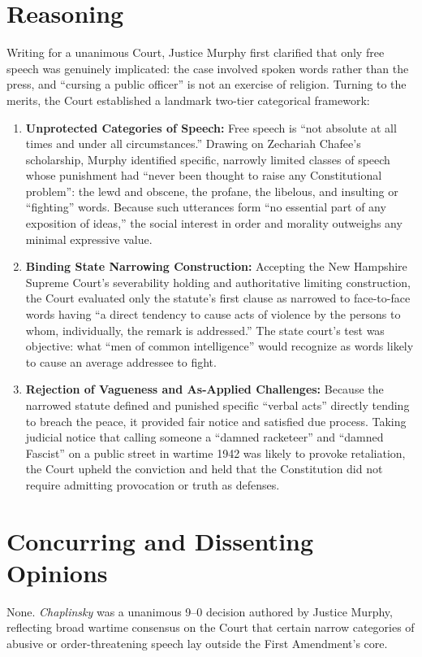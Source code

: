 \documentclass[12pt]{article}
\begin{document}
\section{Reasoning}
Writing for a unanimous Court, Justice Murphy first clarified that only free speech was genuinely implicated: the case involved spoken words rather than the press, and ``cursing a public officer'' is not an exercise of religion. Turning to the merits, the Court established a landmark two-tier categorical framework:
\begin{enumerate}
  \item \textbf{Unprotected Categories of Speech:} Free speech is ``not absolute at all times and under all circumstances.'' Drawing on Zechariah Chafee's scholarship, Murphy identified specific, narrowly limited classes of speech whose punishment had ``never been thought to raise any Constitutional problem'': the lewd and obscene, the profane, the libelous, and insulting or ``fighting'' words. Because such utterances form ``no essential part of any exposition of ideas,'' the social interest in order and morality outweighs any minimal expressive value.
  \item \textbf{Binding State Narrowing Construction:} Accepting the New Hampshire Supreme Court's severability holding and authoritative limiting construction, the Court evaluated only the statute's first clause as narrowed to face-to-face words having ``a direct tendency to cause acts of violence by the persons to whom, individually, the remark is addressed.'' The state court's test was objective: what ``men of common intelligence'' would recognize as words likely to cause an average addressee to fight.
  \item \textbf{Rejection of Vagueness and As-Applied Challenges:} Because the narrowed statute defined and punished specific ``verbal acts'' directly tending to breach the peace, it provided fair notice and satisfied due process. Taking judicial notice that calling someone a ``damned racketeer'' and ``damned Fascist'' on a public street in wartime 1942 was likely to provoke retaliation, the Court upheld the conviction and held that the Constitution did not require admitting provocation or truth as defenses.
\end{enumerate}

\section{Concurring and Dissenting Opinions}
None. \textit{Chaplinsky} was a unanimous 9--0 decision authored by Justice Murphy, reflecting broad wartime consensus on the Court that certain narrow categories of abusive or order-threatening speech lay outside the First Amendment's core.
\end{document}
